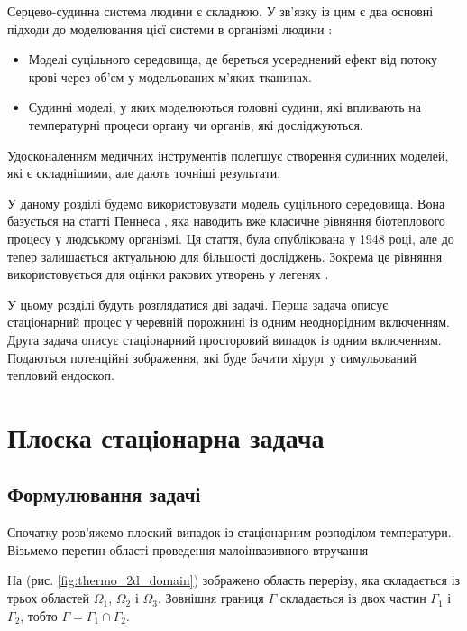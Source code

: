 Серцево-судинна система людини є складною. У зв'язку із цим є два основні підходи до моделювання цієї системи в 
організмі людини \cite{kutz-zhu-heat-transfer-biological-systems}:
\begin{itemize}
    \item Моделі суцільного середовища, де береться усереднений ефект від потоку крові через об'єм у модельованих м'яких
    тканинах. 
    \item Судинні моделі, у яких моделюються головні судини, які впливають на температурні процеси органу чи органів, 
    які досліджуються.
\end{itemize}
\noindent Удосконаленням медичних інструментів полегшує створення судинних моделей, які є складнішими, але дають точніші
результати. 

У даному розділі будемо використовувати модель суцільного середовища. Вона базується на статті Пеннеса
\cite{thermal-process-tissue-pennes}, яка наводить вже класичне рівняння біотеплового процесу у людському організмі. Ця
стаття, була опублікована у 1948 році, але до тепер залишається актуальною для більшості досліджень. Зокрема це рівняння
використовується для оцінки ракових утворень у легенях \cite{lung-tumor-thermal-conductivity}.

У цьому розділі будуть розглядатися дві задачі. Перша задача описує стаціонарний процес у черевній порожнині із одним 
неоднорідним включенням. Друга задача описує стаціонарний просторовий випадок із одним включенням. Подаються потенційні 
зображення, які буде бачити хірург у симульований тепловий ендоскоп.

\section{Плоска стаціонарна задача}

\subsection{Формулювання задачі}

Спочатку розв'яжемо плоский випадок із стаціонарним розподілом температури.
Візьмемо перетин області проведення малоінвазивного втручання

На (рис. \ref{fig:thermo_2d_domain}) зображено область перерізу, яка складається із трьох областей $\Omega_1$, 
$\Omega_2$ і $\Omega_3$. Зовнішня границя $\Gamma$ складається із двох частин $\Gamma_1$ і $\Gamma_2$, тобто 
$\Gamma=\Gamma_1\cap\Gamma_2$. 

